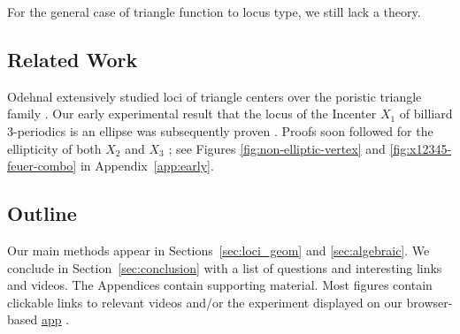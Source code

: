 For the general case of triangle function to locus type, we still lack a theory.

\subsection*{Related Work}

Odehnal extensively studied loci of triangle centers over the poristic triangle family \cite{odehnal2011-poristic}. Our early experimental result that the locus of the Incenter $X_1$ of billiard 3-periodics is an ellipse was subsequently proven \cite{olga14,garcia2019-incenter}. Proofs soon followed for the ellipticity of both $X_2$ \cite{sergei2016-com} and $X_3$ \cite{corentin19,garcia2019-incenter}; see Figures \ref{fig:non-elliptic-vertex} and \ref{fig:x12345-feuer-combo} in Appendix~\ref{app:early}.

\subsection*{Outline}

Our main methods appear in Sections~\ref{sec:loci_geom} and \ref{sec:algebraic}. We conclude in Section~\ref{sec:conclusion} with a list of questions and interesting links and videos. The Appendices contain supporting material. Most figures contain clickable links to relevant videos and/or the experiment displayed on our browser-based \href{https://dan-reznik.github.io/ellipse-mounted-loci-p5js}{app} \cite{darlan2020-ellipse-mounted}.
